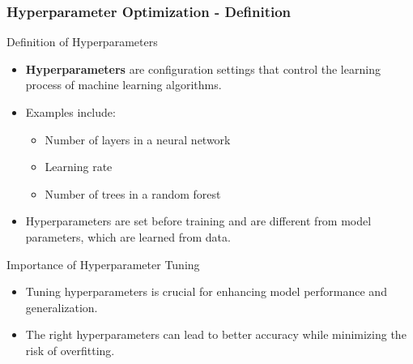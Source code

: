 \documentclass[aspectratio=169]{beamer}
\begin{document}
\begin{frame}[fragile]
    \frametitle{Hyperparameter Optimization - Definition}
    \begin{block}{Definition of Hyperparameters}
        \begin{itemize}
            \item \textbf{Hyperparameters} are configuration settings that control the learning process of machine learning algorithms.
            \item Examples include:
            \begin{itemize}
                \item Number of layers in a neural network
                \item Learning rate
                \item Number of trees in a random forest
            \end{itemize}
            \item Hyperparameters are set before training and are different from model parameters, which are learned from data.
        \end{itemize}
    \end{block}

    \begin{block}{Importance of Hyperparameter Tuning}
        \begin{itemize}
            \item Tuning hyperparameters is crucial for enhancing model performance and generalization.
            \item The right hyperparameters can lead to better accuracy while minimizing the risk of overfitting.
        \end{itemize}
    \end{block}
\end{frame}
\end{document}
